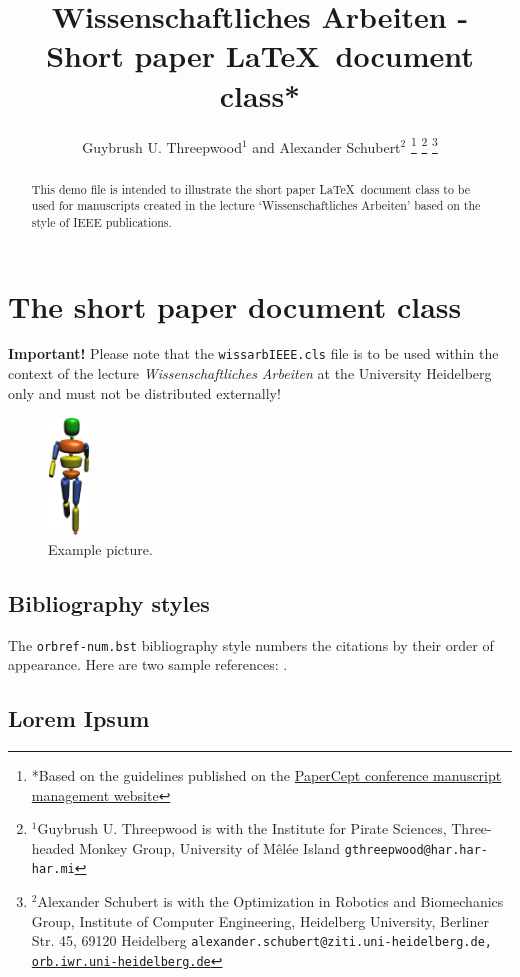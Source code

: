 \documentclass[a4paper, 10pt, journal]{wissarbIEEE}      %
\title{\LARGE \bf
Wissenschaftliches Arbeiten - \\Short paper \LaTeX\ document class*
}
\author{Guybrush U. Threepwood$^{1}$ and Alexander Schubert$^{2}$%
\thanks{*Based on the guidelines published on the \href{http://conf.papercept.net/conferences/support/tex.php}{PaperCept conference manuscript management website}}%
\thanks{$^{1}$Guybrush U. Threepwood is with the Institute for Pirate Sciences, Three-headed Monkey Group, University of  M\^el\'ee Island
        {\tt\small gthreepwood@har.har-har.mi}}%
\thanks{$^{2}$Alexander Schubert is with the Optimization in Robotics and Biomechanics Group, Institute of Computer Engineering, Heidelberg University, Berliner Str. 45, 69120 Heidelberg
        {\tt\small alexander.schubert@ziti.uni-heidelberg.de, \href{http://orb.iwr.uni-heidelberg.de}{orb.iwr.uni-heidelberg.de}}}%
}
\begin{document}
\maketitle

\begin{abstract}

This demo file is intended to illustrate the short paper \LaTeX\ document class to be used for manuscripts created in the lecture `Wissenschaftliches Arbeiten' based on the style of IEEE publications.

\end{abstract}

\section{The short paper document class}
{\bf Important!} Please note that the \verb!wissarbIEEE.cls! file is to be used within the context of the lecture {\it Wissenschaftliches Arbeiten} at the University Heidelberg only and must not be distributed externally!

\begin{figure}[h]
   \centering
   \includegraphics[width=0.1\textwidth]{fig/knubbi.png}
   \caption{Example picture.}
   \label{fig:knubbi}
\end{figure}

\subsection{Bibliography styles}
The \texttt{orbref-num.bst} bibliography style numbers the citations by their order of appearance. Here are two sample references: \cite{Newton1687,Mombaur2009}.

\subsection{Lorem Ipsum}
\lipsum[1]
\end{document}
